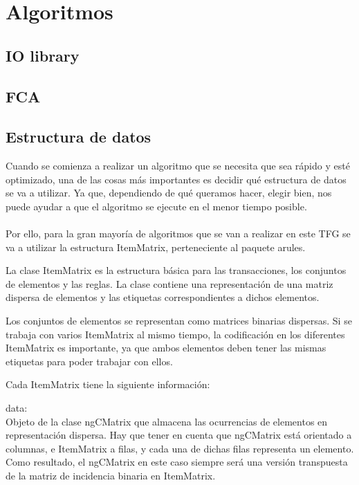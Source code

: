 \section{Algoritmos}
\subsection{IO library}



\subsection{FCA}





\subsection{Estructura de datos}

Cuando se comienza a realizar un algoritmo que se necesita que 
sea r\'apido y est\'e optimizado, una de las cosas m\'as importantes 
es decidir qu\'e estructura de datos se va a utilizar.
Ya que, dependiendo de qu\'e queramos hacer, elegir bien, nos puede 
ayudar a que el algoritmo se ejecute en el menor tiempo posible.
\\
\\
Por ello, para la gran mayor\'ia de algoritmos que se van a realizar 
en este TFG se va a utilizar la estructura ItemMatrix, perteneciente al paquete 
arules.

La clase ItemMatrix es la estructura b\'asica para las transacciones, los 
conjuntos de elementos y las reglas.
La clase contiene una representaci\'on de una matriz dispersa de elementos 
y las etiquetas correspondientes a dichos elementos.

Los conjuntos de elementos se representan como matrices binarias dispersas. 
Si se trabaja con varios ItemMatrix al mismo tiempo, la codificaci\'on 
en los diferentes ItemMatrix es importante, ya que ambos elementos deben tener 
las mismas etiquetas para poder trabajar con ellos.

Cada ItemMatrix tiene la siguiente informaci\'on:


data:\\
Objeto de la clase ngCMatrix que almacena las ocurrencias de elementos en 
representaci\'on dispersa. Hay que tener en cuenta que ngCMatrix est\'a orientado 
a columnas, e ItemMatrix a filas, y cada una de dichas filas representa un elemento.
Como resultado, el ngCMatrix en este caso siempre ser\'a una versi\'on transpuesta 
de la matriz de incidencia binaria en ItemMatrix.


